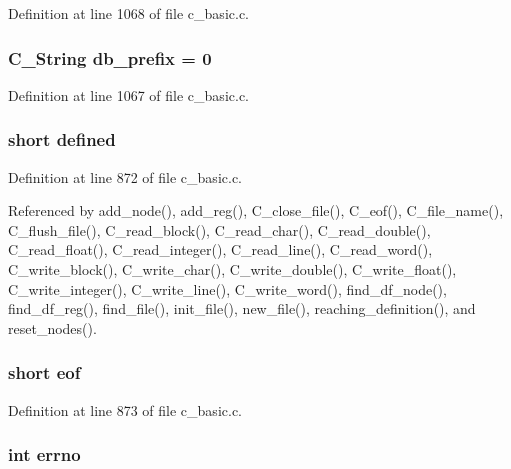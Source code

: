 Definition at line 1068 of file c\_\-basic.c.
\subsubsection{\setlength{\rightskip}{0pt plus 5cm}\bf{C\_\-String} \bf{db\_\-prefix} = 0\hspace{0.3cm}{\tt  [static]}}\label{c__basic_8c_7ad9021bad28b40bf31ddf416ccf46f4}




Definition at line 1067 of file c\_\-basic.c.
\subsubsection{\setlength{\rightskip}{0pt plus 5cm}short \bf{defined}}\label{c__basic_8c_9d887150a3bc9ae3806d3bab61f91a77}




Definition at line 872 of file c\_\-basic.c.

Referenced by add\_\-node(), add\_\-reg(), C\_\-close\_\-file(), C\_\-eof(), C\_\-file\_\-name(), C\_\-flush\_\-file(), C\_\-read\_\-block(), C\_\-read\_\-char(), C\_\-read\_\-double(), C\_\-read\_\-float(), C\_\-read\_\-integer(), C\_\-read\_\-line(), C\_\-read\_\-word(), C\_\-write\_\-block(), C\_\-write\_\-char(), C\_\-write\_\-double(), C\_\-write\_\-float(), C\_\-write\_\-integer(), C\_\-write\_\-line(), C\_\-write\_\-word(), find\_\-df\_\-node(), find\_\-df\_\-reg(), find\_\-file(), init\_\-file(), new\_\-file(), reaching\_\-definition(), and reset\_\-nodes().
\subsubsection{\setlength{\rightskip}{0pt plus 5cm}short \bf{eof}}\label{c__basic_8c_50c8b1968ceaae924798225b2260b1de}




Definition at line 873 of file c\_\-basic.c.
\subsubsection{\setlength{\rightskip}{0pt plus 5cm}int \bf{errno}}\label{c__basic_8c_d65a8842cc674e3ddf69355898c0ecbf}


